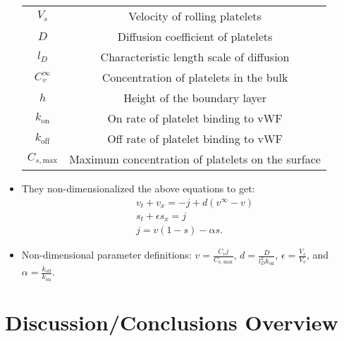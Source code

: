 \documentclass[
10pt, %
letterpaper, %
twocolumn, %
landscape %
]{article}
\begin{document}
\begin{itemize}
\begin{tabular}{|c|c|}
    $V_s$ & Velocity of rolling platelets \\
    $D$ & Diffusion coefficient of platelets \\
    $l_D$ & Characteristic length scale of diffusion \\
    $C_v^\infty$ & Concentration of platelets in the bulk \\
    $h$ & Height of the boundary layer \\
    $k_\text{on}$ & On rate of platelet binding to vWF \\
    $k_\text{off}$ & Off rate of platelet binding to vWF \\
    $C_{s,\text{max}}$ & Maximum concentration of platelets on the
                         surface \\ \hline
  \end{tabular}
\item They non-dimensionalized the above equations to get:
  \begin{align*}
    &v_t + v_x = -j + d(v^\infty - v) \\
    &s_t + \epsilon s_x = j \\
    &j = v(1-s) - \alpha s.
  \end{align*}
\item Non-dimensional parameter definitions: $v = \frac{C_v
    j}{C_\text{s, max}}$, $d = \frac{D}{l_D^2 k_\text{on}}$, $\epsilon
  = \frac{V_s}{V_v}$, and $\alpha =
  \frac{k_\text{off}}{k_\text{on}}$.
\end{itemize}


\section{Discussion/Conclusions Overview}
\end{document}
